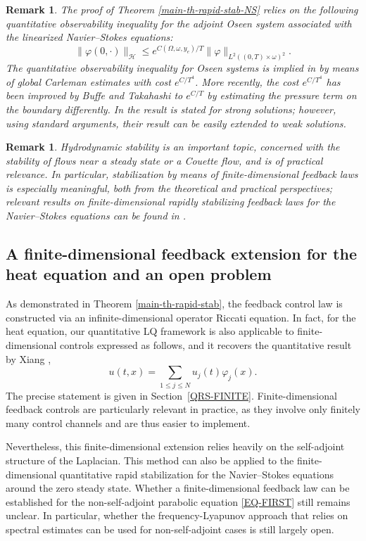 \documentclass[a4paper]{article}
\newtheorem{remark}[theorem]{Remark}
\numberwithin{equation}{section}
\begin{document}
\begin{remark}\label{Remark-NS-1}
The proof of Theorem \ref{main-th-rapid-stab-NS} relies on the following quantitative observability inequality for the adjoint Oseen system associated with the linearized Navier--Stokes equations:
\begin{equation*}\label{NS-OBS}
\|\varphi(0,\cdot)\|_{\mathcal H} \le e^{C(\Omega,\omega,y_e)/T} \|\varphi\|_{L^2((0,T)\times \omega)^2}.
\end{equation*}
The quantitative observability inequality for Oseen systems is implied in \cite{FCGIP} by means of global Carleman estimates with cost $e^{C/T^4}$. More recently, the cost $e^{C/T^4}$ has been improved by Buffe and Takahashi \cite{BT} to $e^{C/T}$ by estimating the pressure term on the boundary differently. In \cite[Corollary 1.5]{BT} the result is stated for strong solutions; however, using standard arguments, their result can be easily extended to weak solutions.
\end{remark}

\begin{remark}\label{Remark-NS-2}
Hydrodynamic stability is an important topic, concerned with the stability of flows near a steady state or a Couette flow, and is of practical relevance. In particular, stabilization by means of finite-dimensional feedback laws is especially meaningful, both from the theoretical and practical perspectives; relevant results on finite-dimensional rapidly stabilizing feedback laws for the Navier--Stokes equations can be found in \cite{BT2,BR,X1}.
\end{remark}


\subsection{A finite-dimensional feedback extension for the  heat equation and an open problem}
As demonstrated in Theorem \ref{main-th-rapid-stab}, the feedback control law is constructed via an infinite-dimensional operator Riccati equation. In fact, for the heat equation, our quantitative LQ framework is also applicable to finite-dimensional controls expressed as follows, and it recovers the quantitative result by Xiang \cite{X2},
$$u(t,x)=\sum_{1\leq j\leq N} u_j(t)\varphi_j(x).$$
The precise statement is given in Section~\ref{QRS-FINITE}. Finite-dimensional feedback controls are particularly relevant in practice, as they involve only finitely many control channels and are thus easier to implement.

Nevertheless, this finite-dimensional extension relies heavily on the self-adjoint structure of the Laplacian. This method can also be applied to the finite-dimensional quantitative rapid stabilization for the Navier--Stokes equations around the zero steady state. Whether a finite-dimensional feedback law can be established for the non-self-adjoint parabolic equation \eqref{EQ-FIRST} still remains unclear. In particular, whether the frequency-Lyapunov approach \cite{X2} that relies on spectral estimates can be used for non-self-adjoint cases is still largely open. 
\vspace{2mm}
\end{document}
